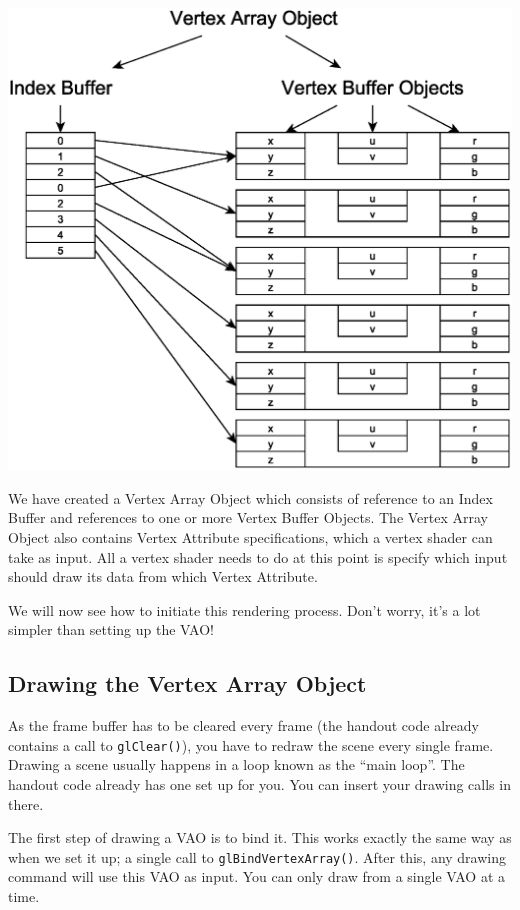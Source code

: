 \centerline{\includegraphics[scale=0.6]{images/openGL_index_buffer.eps}}

We have created a Vertex Array Object which consists of reference to an Index Buffer and references to one or more Vertex Buffer Objects. The Vertex Array Object also contains Vertex Attribute specifications, which a vertex shader can take as input. All a vertex shader needs to do at this point is specify which input should draw its data from which Vertex Attribute.

We will now see how to initiate this rendering process. Don't worry, it's a lot simpler than setting up the VAO!

\subsection{Drawing the Vertex Array Object}

As the frame buffer has to be cleared every frame (the handout code already contains a call to \texttt{glClear()}), you have to redraw the scene every single frame. Drawing a scene usually happens in a loop known as the ``main loop''. The handout code already has one set up for you. You can insert your drawing calls in there.

The first step of drawing a VAO is to bind it. This works exactly the same way as when we set it up; a single call to \texttt{glBindVertexArray()}. After this, any drawing command will use this VAO as input. You can only draw from a single VAO at a time.

